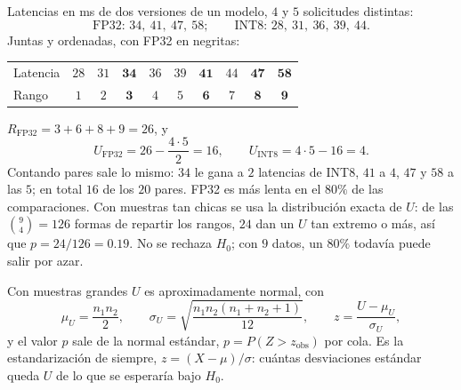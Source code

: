 \documentclass[11pt,letterpaper]{article}
\begin{document}
\begin{ejemplo}
    Latencias en ms de dos versiones de un modelo, $4$ y $5$
    solicitudes distintas:
    \[
        \text{FP32: } 34,\ 41,\ 47,\ 58 ;
        \qquad
        \text{INT8: } 28,\ 31,\ 36,\ 39,\ 44 .
    \]
    Juntas y ordenadas, con FP32 en negritas:
    \begin{center}
    \small
    \begin{tabular}{lccccccccc}
        \toprule
        Latencia & $28$ & $31$ & $\mathbf{34}$ & $36$ & $39$
                 & $\mathbf{41}$ & $44$ & $\mathbf{47}$
                 & $\mathbf{58}$ \\
        Rango & $1$ & $2$ & $\mathbf{3}$ & $4$ & $5$ & $\mathbf{6}$
              & $7$ & $\mathbf{8}$ & $\mathbf{9}$ \\
        \bottomrule
    \end{tabular}
    \end{center}
    $R_{\text{FP32}} = 3 + 6 + 8 + 9 = 26$, y
    \[
        U_{\text{FP32}} = 26 - \frac{4 \cdot 5}{2} = 16 ,
        \qquad
        U_{\text{INT8}} = 4 \cdot 5 - 16 = 4 .
    \]
    Contando pares sale lo mismo: $34$ le gana a $2$ latencias de INT8,
    $41$ a $4$, $47$ y $58$ a las $5$; en total $16$ de los $20$ pares.
    FP32 es más lenta en el $80\%$ de las comparaciones. Con muestras
    tan chicas se usa la distribución exacta de $U$: de las
    $\binom{9}{4} = 126$ formas de repartir los rangos, $24$ dan un $U$
    tan extremo o más, así que $p = 24/126 = 0.19$. No se rechaza
    $H_0$; con $9$ datos, un $80\%$ todavía puede salir por azar.
\end{ejemplo}

Con muestras grandes $U$ es aproximadamente normal, con
\[
    \mu_U = \frac{n_1 n_2}{2} ,
    \qquad
    \sigma_U = \sqrt{\frac{n_1 n_2 (n_1 + n_2 + 1)}{12}} ,
    \qquad
    z = \frac{U - \mu_U}{\sigma_U} ,
\]
y el valor $p$ sale de la normal estándar,
$p = P(Z > z_{\text{obs}})$ por cola. Es la estandarización de siempre,
$z = (X - \mu) / \sigma$: cuántas desviaciones estándar queda $U$ de
lo que se esperaría bajo $H_0$.
\end{document}
